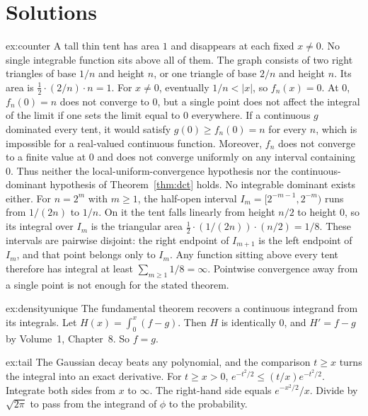 \section{Solutions}

\begin{solution}{ex:counter}
\idea A tall thin tent has area $1$ and disappears at each fixed $x\ne0$. No single integrable function sits above all of them.
\writeup The graph consists of two right triangles of base $1/n$ and height $n$, or one triangle of base $2/n$ and height $n$. Its area is $\tfrac12\cdot(2/n)\cdot n=1$. For $x\ne0$, eventually $1/n<|x|$, so $f_n(x)=0$. At $0$, $f_n(0)=n$ does not converge to $0$, but a single point does not affect the integral of the limit if one sets the limit equal to $0$ everywhere. If a continuous $g$ dominated every tent, it would satisfy $g(0)\ge f_n(0)=n$ for every $n$, which is impossible for a real-valued continuous function. Moreover, $f_n$ does not converge to a finite value at $0$ and does not converge uniformly on any interval containing $0$. Thus neither the local-uniform-convergence hypothesis nor the continuous-dominant hypothesis of Theorem~\ref{thm:dct} holds. No integrable dominant exists either. For $n=2^m$ with $m\ge1$, the half-open interval $I_m=[2^{-m-1},2^{-m})$ runs from $1/(2n)$ to $1/n$. On it the tent falls linearly from height $n/2$ to height $0$, so its integral over $I_m$ is the triangular area $\tfrac12\cdot(1/(2n))\cdot(n/2)=1/8$. These intervals are pairwise disjoint: the right endpoint of $I_{m+1}$ is the left endpoint of $I_m$, and that point belongs only to $I_m$. Any function sitting above every tent therefore has integral at least $\sum_{m\ge1}1/8=\infty$. Pointwise convergence away from a single point is not enough for the stated theorem.
\end{solution}

\begin{solution}{ex:densityunique}
\idea The fundamental theorem recovers a continuous integrand from its integrals.
\writeup Let $H(x)=\int_0^x(f-g)$. Then $H$ is identically $0$, and $H'=f-g$ by Volume~1, Chapter~8. So $f=g$.
\end{solution}

\begin{solution}{ex:tail}
\idea The Gaussian decay beats any polynomial, and the comparison $t\ge x$ turns the integral into an exact derivative.
\writeup For $t\ge x>0$, $e^{-t^2/2}\le (t/x)e^{-t^2/2}$. Integrate both sides from $x$ to $\infty$. The right-hand side equals $e^{-x^2/2}/x$. Divide by $\sqrt{2\pi}$ to pass from the integrand of $\phi$ to the probability.
\end{solution}

